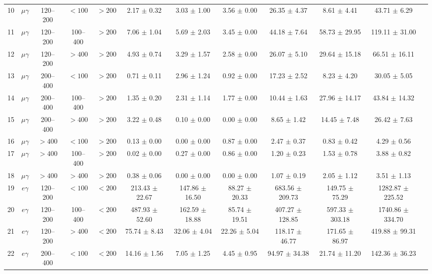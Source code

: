\begin{table}[htbp]
{\begin{tabular}{|c|c|c|c|c|c|c|c|c|c|c|c|}
10 & $\mu\gamma$ & 120--200 & $<100$ & $>200$ & 2.17 $\pm$ 0.32 & 3.03 $\pm$ 1.00 & 3.56 $\pm$ 0.00 & 26.35 $\pm$ 4.37 & 8.61 $\pm$ 4.41 & 43.71 $\pm$ 6.29 &  \\
11 & $\mu\gamma$ & 120--200 & 100--400 & $>200$ & 7.06 $\pm$ 1.04 & 5.69 $\pm$ 2.03 & 3.45 $\pm$ 0.00 & 44.18 $\pm$ 7.64 & 58.73 $\pm$ 29.95 & 119.11 $\pm$ 31.00 &  \\
12 & $\mu\gamma$ & 120--200 & $>400$ & $>200$ & 4.93 $\pm$ 0.74 & 3.29 $\pm$ 1.57 & 2.58 $\pm$ 0.00 & 26.07 $\pm$ 5.10 & 29.64 $\pm$ 15.18 & 66.51 $\pm$ 16.11 &  \\
13 & $\mu\gamma$ & 200--400 & $<100$ & $>200$ & 0.71 $\pm$ 0.11 & 2.96 $\pm$ 1.24 & 0.92 $\pm$ 0.00 & 17.23 $\pm$ 2.52 & 8.23 $\pm$ 4.20 & 30.05 $\pm$ 5.05 &  \\
14 & $\mu\gamma$ & 200--400 & 100--400 & $>200$ & 1.35 $\pm$ 0.20 & 2.31 $\pm$ 1.14 & 1.77 $\pm$ 0.00 & 10.44 $\pm$ 1.63 & 27.96 $\pm$ 14.17 & 43.84 $\pm$ 14.32 &  \\
15 & $\mu\gamma$ & 200--400 & $>400$ & $>200$ & 3.22 $\pm$ 0.48 & 0.10 $\pm$ 0.00 & 0.00 $\pm$ 0.00 & 8.65 $\pm$ 1.42 & 14.45 $\pm$ 7.48 & 26.42 $\pm$ 7.63 &  \\
16 & $\mu\gamma$ & $>400$ & $<100$ & $>200$ & 0.13 $\pm$ 0.00 & 0.00 $\pm$ 0.00 & 0.87 $\pm$ 0.00 & 2.47 $\pm$ 0.37 & 0.83 $\pm$ 0.42 & 4.29 $\pm$ 0.56 &  \\
17 & $\mu\gamma$ & $>400$ & 100--400 & $>200$ & 0.02 $\pm$ 0.00 & 0.27 $\pm$ 0.00 & 0.86 $\pm$ 0.00 & 1.20 $\pm$ 0.23 & 1.53 $\pm$ 0.78 & 3.88 $\pm$ 0.82 &  \\
18 & $\mu\gamma$ & $>400$ & $>400$ & $>200$ & 0.38 $\pm$ 0.06 & 0.00 $\pm$ 0.00 & 0.00 $\pm$ 0.00 & 1.07 $\pm$ 0.19 & 2.05 $\pm$ 1.12 & 3.51 $\pm$ 1.13 &  \\
\hline
19 & $e\gamma$ & 120--200 & $<100$ & $<200$ & 213.43 $\pm$ 22.67 & 147.86 $\pm$ 16.50 & 88.27 $\pm$ 20.33 & 683.56 $\pm$ 209.73 & 149.75 $\pm$ 75.29 & 1282.87 $\pm$ 225.52 &  \\
20 & $e\gamma$ & 120--200 & 100--400 & $<200$ & 487.93 $\pm$ 52.60 & 162.59 $\pm$ 18.88 & 85.74 $\pm$ 19.51 & 407.27 $\pm$ 128.85 & 597.33 $\pm$ 303.18 & 1740.86 $\pm$ 334.70 &  \\
21 & $e\gamma$ & 120--200 & $>400$ & $<200$ & 75.74 $\pm$ 8.43 & 32.06 $\pm$ 4.04 & 22.26 $\pm$ 5.04 & 118.17 $\pm$ 46.77 & 171.65 $\pm$ 86.97 & 419.88 $\pm$ 99.31 &  \\
22 & $e\gamma$ & 200--400 & $<100$ & $<200$ & 14.16 $\pm$ 1.56 & 7.05 $\pm$ 1.25 & 4.45 $\pm$ 0.95 & 94.97 $\pm$ 34.38 & 21.74 $\pm$ 11.20 & 142.36 $\pm$ 36.23 &  \\

\end{tabular}}
\end{table}
